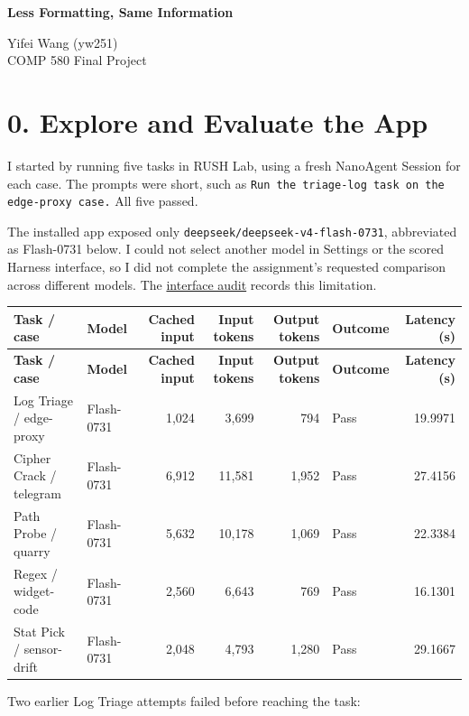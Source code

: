 \documentclass[10pt,letterpaper]{article}
\begin{document}
\begin{center}
{\LARGE\bfseries Less Formatting, Same Information}\par\medskip
Yifei Wang (yw251) \\COMP 580 Final Project
\end{center}
\section*{0. Explore and Evaluate the App}

I started by running five tasks in RUSH Lab, using a fresh NanoAgent Session for each case. The prompts were short, such as \texttt{Run the triage-log task on the edge-proxy case.} All five passed.

The installed app exposed only \texttt{deepseek/deepseek-v4-flash-0731}, abbreviated as Flash-0731 below. I could not select another model in Settings or the scored Harness interface, so I did not complete the assignment's requested comparison across different models. The \href{https://github.com/a-little-hoof/580-final/blob/main/docs/HARNESS\_CONTRACT.md}{interface audit} records this limitation.

\begingroup
\small
\setlength{\tabcolsep}{4pt}
\renewcommand{\arraystretch}{1.15}
\begin{longtable}{@{}llrrrlr@{}}
\toprule
\textbf{Task / case} & \textbf{Model} & \textbf{Cached input} & \textbf{Input tokens} & \textbf{Output tokens} & \textbf{Outcome} & \textbf{Latency (s)} \\
\midrule
\endfirsthead
\toprule
\textbf{Task / case} & \textbf{Model} & \textbf{Cached input} & \textbf{Input tokens} & \textbf{Output tokens} & \textbf{Outcome} & \textbf{Latency (s)} \\
\midrule
\endhead
\bottomrule
\endfoot
Log Triage / edge-proxy & Flash-0731 & 1,024 & 3,699 & 794 & Pass & 19.9971 \\
Cipher Crack / telegram & Flash-0731 & 6,912 & 11,581 & 1,952 & Pass & 27.4156 \\
Path Probe / quarry & Flash-0731 & 5,632 & 10,178 & 1,069 & Pass & 22.3384 \\
Regex / widget-code & Flash-0731 & 2,560 & 6,643 & 769 & Pass & 16.1301 \\
Stat Pick / sensor-drift & Flash-0731 & 2,048 & 4,793 & 1,280 & Pass & 29.1667 \\
\end{longtable}
\endgroup

Two earlier Log Triage attempts failed before reaching the task:
\end{document}
